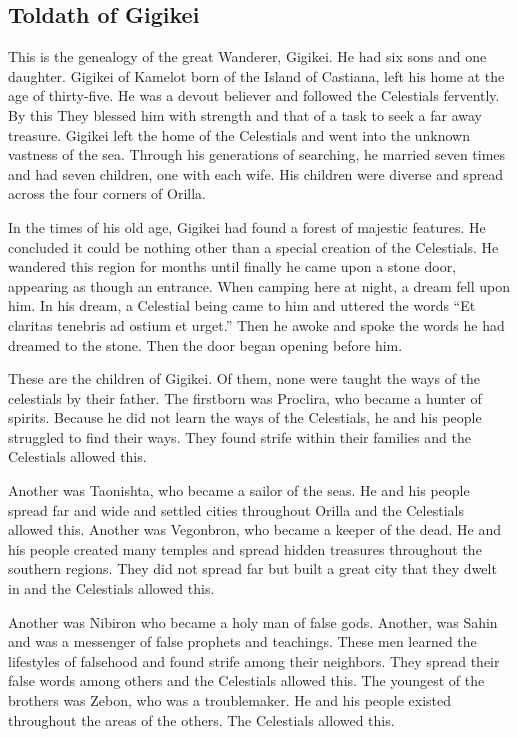 \subsection{Toldath of Gigikei}

This is the genealogy of the great Wanderer, Gigikei. He had six sons and one daughter. Gigikei of Kamelot born of the Island of Castiana, left his home at the age of thirty-five. He was a devout believer and followed the Celestials fervently. By this They blessed him with strength and that of a task to seek a far away treasure. Gigikei left the home of the Celestials and went into the unknown vastness of the sea. Through his generations of searching, he married seven times and had seven children, one with each wife. His children were diverse and spread across the four corners of Orilla. 

In the times of his old age, Gigikei had found a forest of majestic features. He concluded it could be nothing other than a special creation of the Celestials. He wandered this region for months until finally he came upon a stone door, appearing as though an entrance. When camping here at night, a dream fell upon him. In his dream, a Celestial being came to him and uttered the words “Et claritas tenebris ad ostium et urget.” Then he awoke and spoke the words he had dreamed to the stone. Then the door began opening before him. 

These are the children of Gigikei. Of them, none were taught the ways of the celestials by their father. The firstborn was Proclira, who became a hunter of spirits. Because he did not learn the ways of the Celestials, he and his people struggled to find their ways. They found strife within their families and the Celestials allowed this. 

Another was Taonishta, who became a sailor of the seas. He and his people spread far and wide and settled cities throughout Orilla and the Celestials allowed this. 
Another was Vegonbron, who became a keeper of the dead. He and his people created many temples and spread hidden treasures throughout the southern regions. They did not spread far but built a great city that they dwelt in and the Celestials allowed this. 

Another was Nibiron who became a holy man of false gods. Another, was Sahin and was a messenger of false prophets and teachings. These men learned the lifestyles of falsehood and found strife among their neighbors. They spread their false words among others and the Celestials allowed this.
The youngest of the brothers was Zebon, who was a troublemaker. He and his people existed throughout the areas of the others. The Celestials allowed this.

